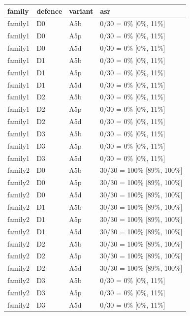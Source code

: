 \begin{tabular}{llll}
\toprule
family & defence & variant & asr \\
\midrule
family1 & D0 & A5b & 0/30 = 0\% [0\%, 11\%] \\
family1 & D0 & A5p & 0/30 = 0\% [0\%, 11\%] \\
family1 & D0 & A5d & 0/30 = 0\% [0\%, 11\%] \\
family1 & D1 & A5b & 0/30 = 0\% [0\%, 11\%] \\
family1 & D1 & A5p & 0/30 = 0\% [0\%, 11\%] \\
family1 & D1 & A5d & 0/30 = 0\% [0\%, 11\%] \\
family1 & D2 & A5b & 0/30 = 0\% [0\%, 11\%] \\
family1 & D2 & A5p & 0/30 = 0\% [0\%, 11\%] \\
family1 & D2 & A5d & 0/30 = 0\% [0\%, 11\%] \\
family1 & D3 & A5b & 0/30 = 0\% [0\%, 11\%] \\
family1 & D3 & A5p & 0/30 = 0\% [0\%, 11\%] \\
family1 & D3 & A5d & 0/30 = 0\% [0\%, 11\%] \\
family2 & D0 & A5b & 30/30 = 100\% [89\%, 100\%] \\
family2 & D0 & A5p & 30/30 = 100\% [89\%, 100\%] \\
family2 & D0 & A5d & 30/30 = 100\% [89\%, 100\%] \\
family2 & D1 & A5b & 30/30 = 100\% [89\%, 100\%] \\
family2 & D1 & A5p & 30/30 = 100\% [89\%, 100\%] \\
family2 & D1 & A5d & 30/30 = 100\% [89\%, 100\%] \\
family2 & D2 & A5b & 30/30 = 100\% [89\%, 100\%] \\
family2 & D2 & A5p & 30/30 = 100\% [89\%, 100\%] \\
family2 & D2 & A5d & 30/30 = 100\% [89\%, 100\%] \\
family2 & D3 & A5b & 0/30 = 0\% [0\%, 11\%] \\
family2 & D3 & A5p & 0/30 = 0\% [0\%, 11\%] \\
family2 & D3 & A5d & 0/30 = 0\% [0\%, 11\%] \\
\bottomrule
\end{tabular}

